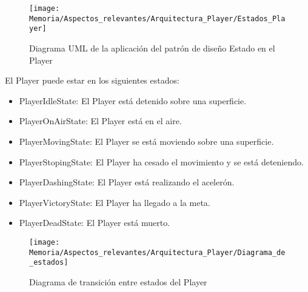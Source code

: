 \begin{figure}[h]
\centering
\texttt{[image: Memoria/Aspectos\_relevantes/Arquitectura\_Player/Estados\_Player]}
\caption{Diagrama UML de la aplicación del patrón de diseño Estado en el Player}
\end{figure}

El Player puede estar en los siguientes estados:
\begin{itemize}
\item
PlayerIdleState: El Player está detenido sobre una superficie.
\item
PlayerOnAirState: El Player está en el aire.
\item
PlayerMovingState: El Player se está moviendo sobre una superficie.
\item
PlayerStopingState: El Player ha cesado el movimiento y se está deteniendo.
\item
PlayerDashingState: El Player está realizando el acelerón.
\item
PlayerVictoryState: El Player ha llegado a la meta.
\item
PlayerDeadState: El Player está muerto.
\end{itemize}

\begin{figure}[h]
\centering
\texttt{[image: Memoria/Aspectos\_relevantes/Arquitectura\_Player/Diagrama\_de\_estados]}
\caption{Diagrama de transición entre estados del Player}
\end{figure}